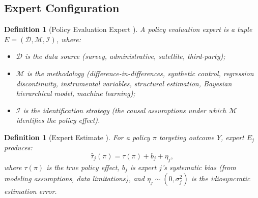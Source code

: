 \documentclass[11pt,a4paper]{article}
\newtheorem{definition}[theorem]{Definition}
\theoremstyle{definition}
\begin{document}
\subsection{Expert Configuration}
\begin{definition}[Policy Evaluation Expert ]
\label{def:policy_expert}
A policy evaluation expert is a tuple $E = (\mathcal{D}, \mathcal{M}, \mathcal{I})$, where:
\begin{itemize}
    \item $\mathcal{D}$ is the data source (survey, administrative, satellite, third-party);
    \item $\mathcal{M}$ is the methodology (difference-in-differences, synthetic control, regression discontinuity, instrumental variables, structural estimation, Bayesian hierarchical model, machine learning);
    \item $\mathcal{I}$ is the identification strategy (the causal assumptions under which $\mathcal{M}$ identifies the policy effect).
\end{itemize}
\end{definition}
\begin{definition}[Expert Estimate ]
\label{def:expert_estimate}
For a policy $\pi$ targeting outcome $Y$, expert $E_j$ produces:
\begin{equation}
    \hat{\tau}_j(\pi) = \tau(\pi) + b_j + \eta_j,
    \label{eq:expert_estimate}
\end{equation}
where $\tau(\pi)$ is the true policy effect, $b_j$ is expert $j$'s systematic bias (from modeling assumptions, data limitations), and $\eta_j \sim (0, \sigma_j^2)$ is the idiosyncratic estimation error.
\end{definition}
\end{document}

